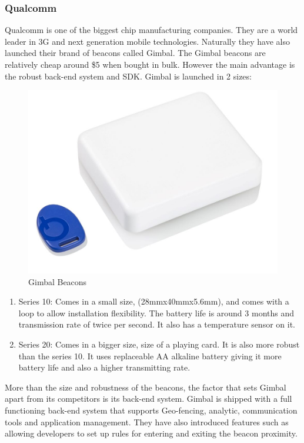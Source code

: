 \subsubsection{Qualcomm}

Qualcomm\cite{quallcomm} is one of the biggest chip manufacturing
companies. They are a world leader in 3G and next generation mobile
technologies. Naturally they have also launched their brand of beacons
called Gimbal\cite{gimbal}. The Gimbal beacons are relatively cheap
around \$5 when bought in bulk. However the main advantage is the
robust back-end system and SDK. Gimbal is launched in 2 sizes:

\begin{figure}[H]
\includegraphics[scale=0.3]{images/gimbal-beacon}

\protect\caption{Gimbal Beacons}
\end{figure}

\begin{enumerate}
\item Series 10: Comes in a small size, (28mmx40mmx5.6mm), and comes with
a loop to allow installation flexibility. The battery life is around
3 months and transmission rate of twice per second. It also has a
temperature sensor on it.
\item Series 20: Comes in a bigger size, size of a playing card. It is also
more robust than the series 10. It uses replaceable AA alkaline battery
giving it more battery life and also a higher transmitting rate.
\end{enumerate}
More than the size and robustness of the beacons, the factor that
sets Gimbal apart from its competitors is its back-end system. Gimbal
is shipped with a full functioning back-end system that supports Geo-fencing\cite{geofencing},
analytic, communication tools and application management. They have
also introduced features such as allowing developers to set up rules
for entering and exiting the beacon proximity.


